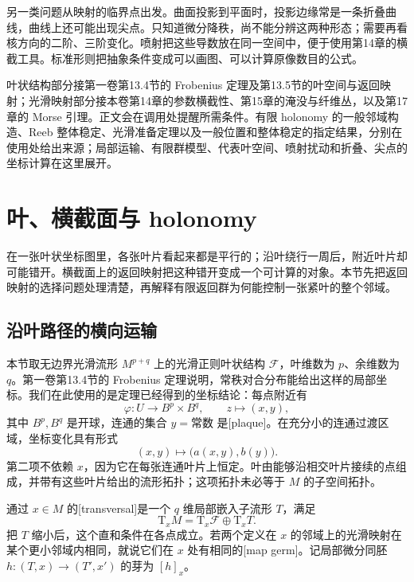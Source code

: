 \ProseParagraphBreak

另一类问题从映射的临界点出发。曲面投影到平面时，投影边缘常是一条折叠曲线，曲线上还可能出现尖点。只知道微分降秩，尚不能分辨这两种形态；需要再看核方向的二阶、三阶变化。喷射把这些导数放在同一空间中，便于使用第14章的横截工具。标准形则把抽象条件变成可以画图、可以计算原像数目的公式。

\ProseParagraphBreak

叶状结构部分接第一卷第13.4节的 Frobenius 定理及第13.5节的叶空间与返回映射；光滑映射部分接本卷第14章的参数横截性、第15章的淹没与纤维丛，以及第17章的 Morse 引理。正文会在调用处提醒所需条件。有限 holonomy 的一般邻域构造、Reeb 整体稳定、光滑准备定理以及一般位置和整体稳定的指定结果，分别在使用处给出来源；局部运输、有限群模型、代表叶空间、喷射扰动和折叠、尖点的坐标计算在这里展开。

\section{叶、横截面与 holonomy}
\label{g2:sec:D01}

在一张叶状坐标图里，各张叶片看起来都是平行的；沿叶绕行一周后，附近叶片却可能错开。横截面上的返回映射把这种错开变成一个可计算的对象。本节先把返回映射的选择问题处理清楚，再解释有限返回群为何能控制一张紧叶的整个邻域。

\subsection{沿叶路径的横向运输}
\label{g2:subsec:D01:01}

本节取无边界光滑流形 \(M^{p+q}\) 上的光滑正则叶状结构 \(\mathcal F\)，叶维数为 \(p\)、余维数为 \(q\)。第一卷第13.4节的 Frobenius 定理说明，常秩对合分布能给出这样的局部坐标。我们在此使用的是定理已经得到的坐标结论：每点附近有
\[
	\varphi:U\longrightarrow B^p\times B^q,\qquad z\longmapsto(x,y),
\]
其中 \(B^p,B^q\) 是开球，连通的集合 \(y=\text{常数}\) 是[plaque]。在充分小的连通过渡区域，坐标变化具有形式
\[
	(x,y)\longmapsto\bigl(a(x,y),b(y)\bigr).
\]
第二项不依赖 \(x\)，因为它在每张连通叶片上恒定。叶由能够沿相交叶片接续的点组成，并带有这些叶片给出的流形拓扑；这项拓扑未必等于 \(M\) 的子空间拓扑。

\begin{definition}\label{g2:def:foliation-transversal-germ}
	通过 \(x\in M\) 的[transversal]是一个 \(q\) 维局部嵌入子流形 \(T\)，满足
	\[
		\mathrm T_xM=\mathrm T_x\mathcal F\oplus\mathrm T_xT.
	\]
	把 \(T\) 缩小后，这个直和条件在各点成立。若两个定义在 \(x\) 的邻域上的光滑映射在某个更小邻域内相同，就说它们在 \(x\) 处有相同的[map germ]。记局部微分同胚 \(h:(T,x)\to(T',x')\) 的芽为 \([h]_x\)。
\end{definition}

